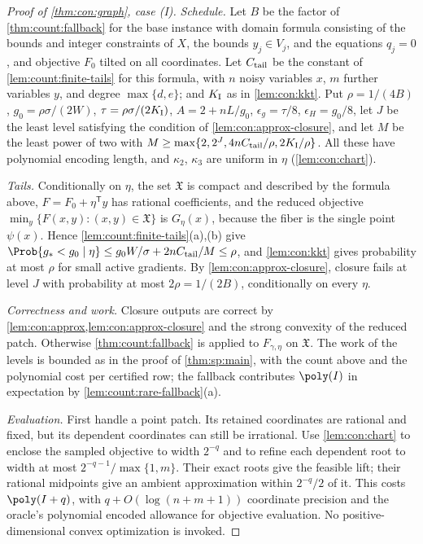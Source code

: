 \begin{proof}[Proof of \cref{thm:con:graph}, case (I)]
\emph{Schedule.} Let $B$ be the factor of \cref{thm:count:fallback} for the
base instance with domain formula consisting of the bounds and integer
constraints of $X$, the bounds $y_j\in V_j$, and the equations $q_j=0$, and
objective $F_0$ tilted on all coordinates. Let $C_{\rm tail}$ be the constant
of \cref{lem:count:finite-tails} for this formula, with $n$ noisy variables
$x$, $m$ further variables $y$, and degree $\max\{d,e\}$; and $K_{\rm I}$ as in
\cref{lem:con:kkt}. Put $\rho=1/(4B)$, $g_0=\rho\sigma/(2W)$,
$\tau=\rho\sigma/(2K_{\rm I})$, $A=2+nL/g_0$, $\epsilon_g=\tau/8$,
$\epsilon_H=g_0/8$, let $J$ be the least level satisfying the condition of
\cref{lem:con:approx-closure}, and let $M$ be the least power of two with
$M\ge\max\{2,2^J,4nC_{\rm tail}/\rho,2K_{\rm I}/\rho\}$. All these have
polynomial encoding length, and $\kappa_2$, $\kappa_3$ are uniform in $\eta$
(\cref{lem:con:chart}).

\emph{Tails.} Conditionally on $\eta$, the set $\mathfrak X$ is compact and
described by the formula above, $F=F_0+\eta^{\mathsf T}y$ has rational
coefficients, and the reduced objective $\min_y\{F(x,y):(x,y)\in\mathfrak X\}$
is $G_\eta(x)$, because the fiber is the single point $\psi(x)$. Hence
\cref{lem:count:finite-tails}(a),(b) give
$\Prob\{g_*<g_0\mid\eta\}\le g_0W/\sigma+2nC_{\rm tail}/M\le\rho$, and
\cref{lem:con:kkt} gives probability at most $\rho$ for small active
gradients. By \cref{lem:con:approx-closure}, closure fails at level $J$ with
probability at most $2\rho=1/(2B)$, conditionally on every $\eta$.

\emph{Correctness and work.} Closure outputs are correct by
\cref{lem:con:approx,lem:con:approx-closure} and the strong convexity of the
reduced patch. Otherwise \cref{thm:count:fallback} is applied to
$F_{\gamma,\eta}$ on $\mathfrak X$. The work of the levels is bounded as in the
proof of \cref{thm:sp:main}, with the count above and the polynomial cost per
certified row; the fallback contributes $\poly(I)$ in expectation by
\cref{lem:count:rare-fallback}(a).

\emph{Evaluation.} First handle a point patch. Its retained coordinates are
rational and fixed, but its dependent coordinates can still be irrational.
Use \cref{lem:con:chart} to enclose the sampled objective to width $2^{-q}$
and to refine each dependent root to width at most
$2^{-q-1}/\max\{1,m\}$. Their exact roots give the feasible lift; their
rational midpoints give an ambient approximation within $2^{-q}/2$ of it.
This costs $\poly(I+q)$, with $q+O(\log(n+m+1))$ coordinate precision
and the oracle's polynomial encoded allowance for objective evaluation.
No positive-dimensional convex optimization is invoked.


\end{proof}
